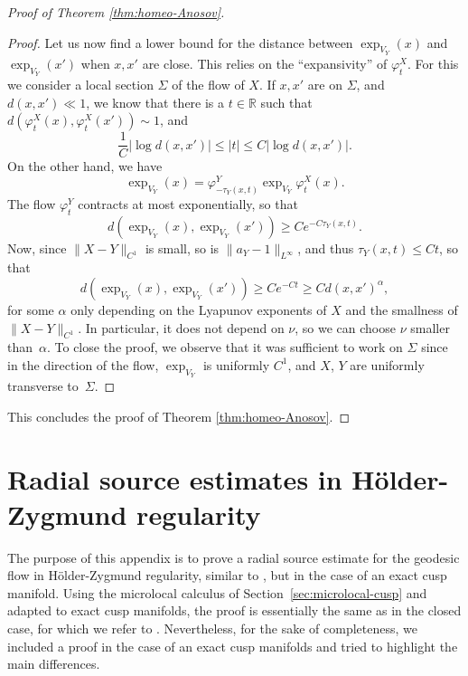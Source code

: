 \documentclass[JEP,XML,SOM,Unicode,NoFloatCountersInSection]{cedram}
\newcommand{\R}{\mathbb{R}}
\theoremstyle{plain}
\theoremstyle{definition}
\begin{document}
\begin{proof}[Proof of Theorem \ref{thm:homeo-Anosov}]
\begin{proof}
Let us now find a lower bound for the distance between $\exp_{V_Y}(x)$ and $\exp_{V_Y}(x')$ when $x,x'$ are close. This relies on the ``expansivity'' of $\varphi^X_t$. For this we consider a local section $\Sigma$ of the flow of $X$. If $x,x'$ are on $\Sigma$, and $d(x,x') \ll 1$, we know that there is a $t\in \R$ such that $d(\varphi_t^X(x),\varphi^X_t(x')) \sim 1$, and
\[
\frac{1}{C}|\log d(x,x')| \leq |t| \leq C |\log d(x,x')|.
\]
On the other hand, we have
\[
\exp_{V_Y}(x) = \varphi^Y_{-\tau_Y(x,t)} \exp_{V_Y} \varphi^X_t(x).
\]
The flow $\varphi^Y_t$ contracts at most exponentially, so that
\[
d(\exp_{V_Y}(x), \exp_{V_Y}(x')) \geq C e^{- C\tau_Y(x,t)}.
\]
Now, since $\|X-Y\|_{C^1}$ is small, so is $\| a_Y - 1\|_{L^\infty}$, and thus $\tau_Y(x,t)\leq Ct$, so that
\[
d(\exp_{V_Y}(x), \exp_{V_Y}(x')) \geq C e^{- C t}\geq C d(x,x')^{\alpha},
\]
for some $\alpha$ only depending on the Lyapunov exponents of $X$ and the smallness of $\|X-Y\|_{C^1}$. In particular, it does not depend on $\nu$, so we can choose $\nu$ smaller than~$\alpha$. To close the proof, we observe that it was sufficient to work on $\Sigma$ since in the direction of the flow, $\exp_{V_Y}$ is uniformly $C^1$, and $X$, $Y$ are uniformly transverse to~$\Sigma$.
\end{proof}

This concludes the proof of Theorem \ref{thm:homeo-Anosov}.
\end{proof}

\section{Radial source estimates in Hölder-Zygmund regularity}

\label{section:radial}

The purpose of this appendix is to prove a radial source estimate for the geodesic flow in Hölder-Zygmund regularity, similar to \cite{Bonthonneau-Lefeuvre-21}, but in the case of an exact cusp manifold. Using the microlocal calculus of Section~\ref{sec:microlocal-cusp} and adapted to exact cusp manifolds, the proof is essentially the same as in the closed case, for which we refer to \cite{Bonthonneau-Lefeuvre-21}. Nevertheless, for the sake of completeness, we included a proof in the case of an exact cusp manifolds and tried to highlight the main differences.
\end{document}
